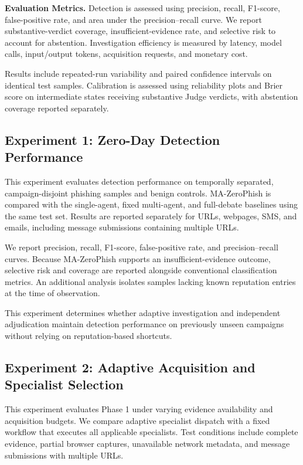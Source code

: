 \medskip
\noindent\textbf{Evaluation Metrics.}
Detection is assessed using precision,
recall, F1-score, false-positive rate,
and area under the precision--recall
curve. We report substantive-verdict
coverage, insufficient-evidence rate,
and selective risk to account for
abstention. Investigation efficiency
is measured by latency, model calls,
input/output tokens, acquisition
requests, and monetary cost.

Results include repeated-run variability
and paired confidence intervals on
identical test samples. Calibration
is assessed using reliability plots
and Brier score on intermediate states
receiving substantive Judge verdicts,
with abstention coverage reported
separately.


\subsection{Experiment 1: Zero-Day
Detection Performance}
\label{sec:exp1}

This experiment evaluates detection
performance on temporally separated,
campaign-disjoint phishing samples
and benign controls. MA-ZeroPhish
is compared with the single-agent,
fixed multi-agent, and full-debate
baselines using the same test set.
Results are reported separately
for URLs, webpages, SMS, and emails,
including message submissions
containing multiple URLs.

We report precision, recall,
F1-score, false-positive rate,
and precision--recall curves.
Because MA-ZeroPhish supports an
insufficient-evidence outcome,
selective risk and coverage are
reported alongside conventional
classification metrics. An additional
analysis isolates samples lacking
known reputation entries at the
time of observation.

This experiment determines whether
adaptive investigation and independent
adjudication maintain detection
performance on previously unseen
campaigns without relying on
reputation-based shortcuts.

\subsection{Experiment 2: Adaptive
Acquisition and Specialist Selection}
\label{sec:exp2}

This experiment evaluates Phase 1
under varying evidence availability
and acquisition budgets. We compare
adaptive specialist dispatch with
a fixed workflow that executes
all applicable specialists. Test
conditions include complete evidence,
partial browser captures, unavailable
network metadata, and message
submissions with multiple URLs.

